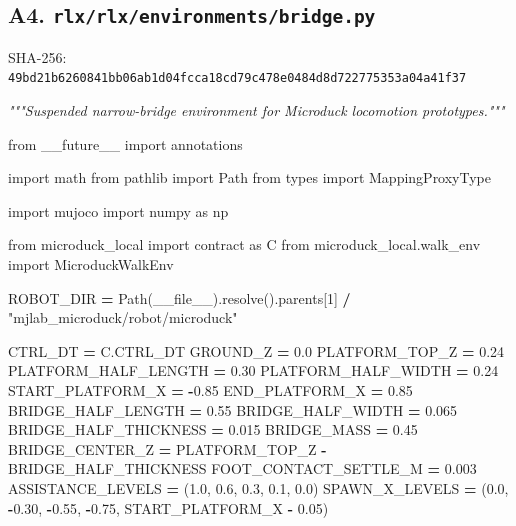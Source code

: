 \documentclass[
  chinese,
  11pt,
  letterpaper,
]{article}
\newenvironment{Shaded}{\begin{snugshade}}{\end{snugshade}}
\newcommand{\CommentTok}[1]{\textcolor[rgb]{0.56,0.35,0.01}{\textit{#1}}}
\newcommand{\DecValTok}[1]{\textcolor[rgb]{0.00,0.00,0.81}{#1}}
\newcommand{\FloatTok}[1]{\textcolor[rgb]{0.00,0.00,0.81}{#1}}
\newcommand{\ImportTok}[1]{#1}
\newcommand{\NormalTok}[1]{#1}
\newcommand{\OperatorTok}[1]{\textcolor[rgb]{0.81,0.36,0.00}{\textbf{#1}}}
\newcommand{\StringTok}[1]{\textcolor[rgb]{0.31,0.60,0.02}{#1}}
\newcommand{\VariableTok}[1]{\textcolor[rgb]{0.00,0.00,0.00}{#1}}
\renewenvironment{Shaded}{\par\smallskip}{\par\smallskip}
\begin{document}
\subsection{\texorpdfstring{A4.
\texttt{rlx/\allowbreak{}rlx/\allowbreak{}environm\allowbreak{}ents/\allowbreak{}bridge.p\allowbreak{}y}}{A4. }}\label{a4.-rlxrlxenvironmentsbridge.py}

SHA-256:
\texttt{49bd21b6\allowbreak{}260841bb\allowbreak{}06ab1d04\allowbreak{}fcca18cd\allowbreak{}79c478e0\allowbreak{}484d8d72\allowbreak{}2775353a\allowbreak{}04a41f37\allowbreak{}}

\begin{Shaded}
\begin{Highlighting}[]
\CommentTok{"""Suspended narrow{-}bridge environment for Microduck locomotion prototypes."""}

\ImportTok{from}\NormalTok{ \_\_future\_\_ }\ImportTok{import}\NormalTok{ annotations}

\ImportTok{import}\NormalTok{ math}
\ImportTok{from}\NormalTok{ pathlib }\ImportTok{import}\NormalTok{ Path}
\ImportTok{from}\NormalTok{ types }\ImportTok{import}\NormalTok{ MappingProxyType}

\ImportTok{import}\NormalTok{ mujoco}
\ImportTok{import}\NormalTok{ numpy }\ImportTok{as}\NormalTok{ np}

\ImportTok{from}\NormalTok{ microduck\_local }\ImportTok{import}\NormalTok{ contract }\ImportTok{as}\NormalTok{ C}
\ImportTok{from}\NormalTok{ microduck\_local.walk\_env }\ImportTok{import}\NormalTok{ MicroduckWalkEnv}

\NormalTok{ROBOT\_DIR }\OperatorTok{=}\NormalTok{ Path(}\VariableTok{\_\_file\_\_}\NormalTok{).resolve().parents[}\DecValTok{1}\NormalTok{] }\OperatorTok{/} \StringTok{"mjlab\_microduck/robot/microduck"}

\NormalTok{CTRL\_DT }\OperatorTok{=}\NormalTok{ C.CTRL\_DT}
\NormalTok{GROUND\_Z }\OperatorTok{=} \FloatTok{0.0}
\NormalTok{PLATFORM\_TOP\_Z }\OperatorTok{=} \FloatTok{0.24}
\NormalTok{PLATFORM\_HALF\_LENGTH }\OperatorTok{=} \FloatTok{0.30}
\NormalTok{PLATFORM\_HALF\_WIDTH }\OperatorTok{=} \FloatTok{0.24}
\NormalTok{START\_PLATFORM\_X }\OperatorTok{=} \OperatorTok{{-}}\FloatTok{0.85}
\NormalTok{END\_PLATFORM\_X }\OperatorTok{=} \FloatTok{0.85}
\NormalTok{BRIDGE\_HALF\_LENGTH }\OperatorTok{=} \FloatTok{0.55}
\NormalTok{BRIDGE\_HALF\_WIDTH }\OperatorTok{=} \FloatTok{0.065}
\NormalTok{BRIDGE\_HALF\_THICKNESS }\OperatorTok{=} \FloatTok{0.015}
\NormalTok{BRIDGE\_MASS }\OperatorTok{=} \FloatTok{0.45}
\NormalTok{BRIDGE\_CENTER\_Z }\OperatorTok{=}\NormalTok{ PLATFORM\_TOP\_Z }\OperatorTok{{-}}\NormalTok{ BRIDGE\_HALF\_THICKNESS}
\NormalTok{FOOT\_CONTACT\_SETTLE\_M }\OperatorTok{=} \FloatTok{0.003}
\NormalTok{ASSISTANCE\_LEVELS }\OperatorTok{=}\NormalTok{ (}\FloatTok{1.0}\NormalTok{, }\FloatTok{0.6}\NormalTok{, }\FloatTok{0.3}\NormalTok{, }\FloatTok{0.1}\NormalTok{, }\FloatTok{0.0}\NormalTok{)}
\NormalTok{SPAWN\_X\_LEVELS }\OperatorTok{=}\NormalTok{ (}\FloatTok{0.0}\NormalTok{, }\OperatorTok{{-}}\FloatTok{0.30}\NormalTok{, }\OperatorTok{{-}}\FloatTok{0.55}\NormalTok{, }\OperatorTok{{-}}\FloatTok{0.75}\NormalTok{, START\_PLATFORM\_X }\OperatorTok{{-}} \FloatTok{0.05}\NormalTok{)}


\end{Highlighting}
\end{Shaded}
\end{document}
